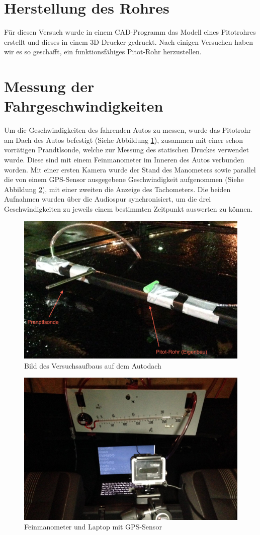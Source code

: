 \section{Herstellung des Rohres}
Für diesen Versuch wurde in einem CAD-Programm das Modell eines Pitotrohres erstellt und dieses in einem 3D-Drucker gedruckt. Nach einigen Versuchen haben wir es so geschafft, ein funktionsfähiges Pitot-Rohr herzustellen.

\section{Messung der Fahrgeschwindigkeiten}
Um die Geschwindigkeiten des fahrenden Autos zu messen, wurde das Pitotrohr am Dach des Autos befestigt (Siehe Abbildung \ref{rohre}), zusammen mit einer schon vorrätigen Prandtlsonde, welche zur Messung des statischen Druckes verwendet wurde. Diese sind mit einem Feinmanometer im Inneren des Autos verbunden worden. Mit einer ersten Kamera wurde der Stand des Manometers sowie parallel die von einem GPS-Sensor ausgegebene Geschwindigkeit aufgenommen (Siehe Abbildung \ref{messung}), mit einer zweiten die Anzeige des Tachometers. Die beiden Aufnahmen wurden über die Audiospur synchronisiert, um die drei Geschwindigkeiten zu jeweils einem bestimmten Zeitpunkt auswerten zu können.

\begin{figure}
\centering
	\includegraphics[width=.8\textwidth]{images/rohre-kommentiert.png}
	\caption{Bild des Versuchsaufbaus auf dem Autodach}
	\label{rohre}
\end{figure}

\begin{figure}
\centering
	\includegraphics[width=.8\textwidth]{images/messung.jpg}
	\caption{Feinmanometer und Laptop mit GPS-Sensor}
	\label{messung}
\end{figure}

